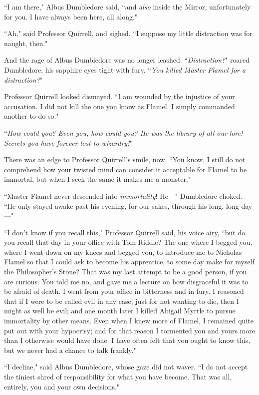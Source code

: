 ``I am there," Albus Dumbledore said, ``and \emph{also} inside the Mirror, unfortunately for you. I have always been here, all along."

``Ah," said Professor Quirrell, and sighed. ``I suppose my little distraction was for naught, then."

And the rage of Albus Dumbledore was no longer leashed. ``\emph{Distraction?}" roared Dumbledore, his sapphire eyes tight with fury. ``\emph{You killed Master Flamel for a distraction?}"

Professor Quirrell looked dismayed. ``I am wounded by the injustice of your accusation. I did not kill the one you know as Flamel. I simply commanded another to do so."

``\emph{How could you? Even you, how could you? He was the library of all our lore! Secrets you have forever lost to wizardry!}"

There was an edge to Professor Quirrell's smile, now. ``You know, I still do not comprehend how your twisted mind can consider it acceptable for Flamel to be immortal, but when I seek the same it makes me a monster."

``Master Flamel never descended into \emph{immortality}! He—" Dumbledore choked. ``He only stayed awake past his evening, for our sakes, through his long, long day—"

``I don't know if you recall this," Professor Quirrell said, his voice airy, ``but do you recall that day in your office with Tom Riddle? The one where I begged you, where I went down on my knees and begged you, to introduce me to Nicholas Flamel so that I could ask to become his apprentice, to some day make for myself the Philosopher's Stone? That was my last attempt to be a good person, if you are curious. You told me no, and gave me a lecture on how disgraceful it was to be afraid of death. I went from your office in bitterness and in fury. I reasoned that if I were to be called evil in any case, just for not wanting to die, then I might as well be evil; and one month later I killed Abigail Myrtle to pursue immortality by other means. Even when I knew more of Flamel, I remained quite put out with your hypocrisy; and for that reason I tormented you and yours more than I otherwise would have done. I have often felt that you ought to know this, but we never had a chance to talk frankly."

``I decline," said Albus Dumbledore, whose gaze did not waver. ``I do not accept the tiniest shred of responsibility for what you have become. That was all, entirely, you and your own decisions."

